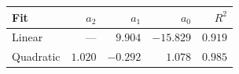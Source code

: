 \begin{tabular}{lrrrr}
\toprule
Fit & $a_2$ & $a_1$ & $a_0$ & $R^2$ \\
\midrule
Linear & --- & $9.904$ & $-15.829$ & $0.919$ \\
Quadratic & $1.020$ & $-0.292$ & $1.078$ & $0.985$ \\
\bottomrule
\end{tabular}

